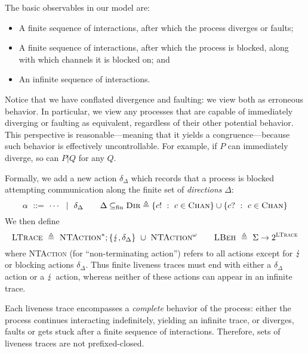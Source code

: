 \documentclass{entcs}
\begin{document}
The basic observables in our model are:
\begin{itemize}
\item A finite sequence of interactions, after which the process
  diverges or faults;
\item A finite sequence of interactions, after which the process
  is blocked, along with which channels it is blocked on; and
\item An infinite sequence of interactions.
\end{itemize}
\noindent
Notice that we have conflated divergence and faulting: we view both as
erroneous behavior.  In particular, we view any processes that are
capable of immediately diverging or faulting as equivalent, regardless
of their other potential behavior.  This perspective is
reasonable---meaning that it yields a congruence---because such
behavior is effectively uncontrollable.  For example, if $P$ can
immediately diverge, so can $P|Q$ for any $Q$.

Formally, we add a new action $\delta_\Delta$ which records that a
process is blocked attempting
communication along the finite set of \emph{directions} $\Delta$:
\[
\alpha\ ::=\ \cdots \ \ |\ \  \delta_\Delta \qquad
\Delta \subseteq_\textrm{fin} \textsc{Dir} \triangleq 
  \{ c!\ :\ c\in\textsc{Chan} \} \cup \{ c?\ :\ c\in\textsc{Chan} \}
\]
We then define
\[ 
\textsc{LTrace}\ \eqdef\ \textsc{NTAction}^*;\{ \fault, \delta_\Delta\}\ \cup\  
  \textsc{NTAction}^\omega
  \qquad
\textsc{LBeh}\ \eqdef\ \Sigma \rightarrow 2^{\textsc{LTrace}} 
\]
where \textsc{NTAction} (for ``non-terminating action'') refers to all
actions except for $\lightning$ or blocking actions $\delta_\Delta$.  Thus
finite liveness traces must end with either a $\delta_\Delta$ action
or a $\lightning$ action, whereas neither of these actions can appear in
an infinite trace.

Each liveness trace encompasses a \emph{complete} behavior of the
process: either the process continues interacting indefinitely,
yielding an infinite trace, or diverges, faults or gets stuck after a
finite sequence of interactions.  Therefore, sets of liveness traces
are not prefixed-closed.  
\end{document}
